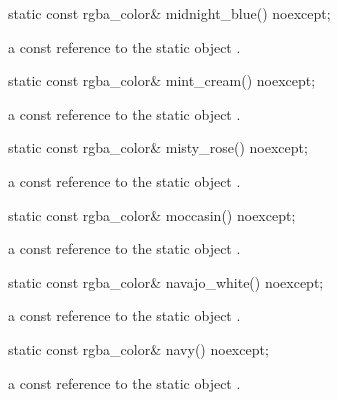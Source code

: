 \begin{itemdecl}
static const rgba_color& midnight_blue() noexcept;
\end{itemdecl}
\begin{itemdescr}
\pnum
\returns
a const reference to the static  object .
\end{itemdescr}

\begin{itemdecl}
static const rgba_color& mint_cream() noexcept;
\end{itemdecl}
\begin{itemdescr}
\pnum
\returns
a const reference to the static  object .
\end{itemdescr}

\begin{itemdecl}
static const rgba_color& misty_rose() noexcept;
\end{itemdecl}
\begin{itemdescr}
\pnum
\returns
a const reference to the static  object .
\end{itemdescr}

\begin{itemdecl}
static const rgba_color& moccasin() noexcept;
\end{itemdecl}
\begin{itemdescr}
\pnum
\returns
a const reference to the static  object .
\end{itemdescr}

\begin{itemdecl}
static const rgba_color& navajo_white() noexcept;
\end{itemdecl}
\begin{itemdescr}
\pnum
\returns
a const reference to the static  object .
\end{itemdescr}

\begin{itemdecl}
static const rgba_color& navy() noexcept;
\end{itemdecl}
\begin{itemdescr}
\pnum
\returns
a const reference to the static  object .
\end{itemdescr}

